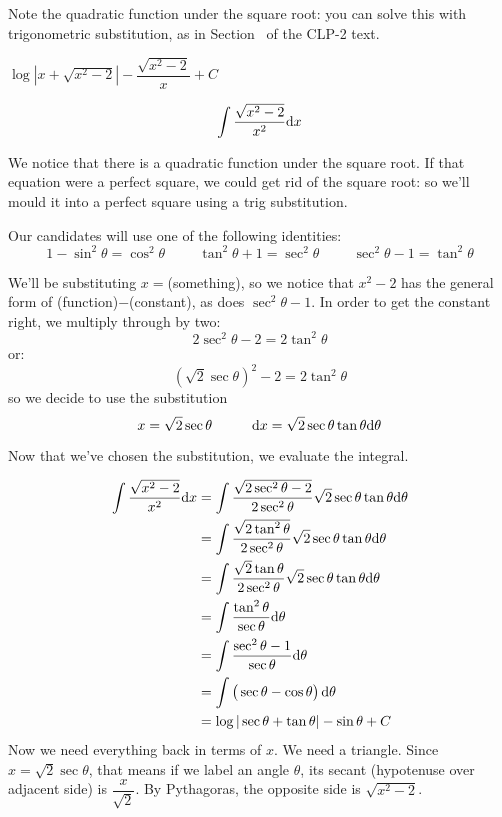 \begin{hint}
Note the quadratic function under the square root: you can solve this with trigonometric substitution, as in Section~ of the CLP-2 text.
\end{hint}

\begin{answer}
$\log \left| x+{\sqrt{x^2-2}}
\right|-\dfrac{\sqrt{x^2-2}}{x}+C$
\end{answer}

\begin{solution}

\[\int \frac{\sqrt{x^2-2}}{x^2}\mathrm{d}x\]

We notice that there is a quadratic function under the square root. If that equation were a perfect square, we could get rid of the square root: so we'll mould it into a perfect square using a trig substitution.

Our candidates will use one of the following identities:
\[1-\sin^2\theta=\cos^2\theta \hspace{1cm} \tan^2\theta+1=\sec^2\theta \hspace{1cm} \sec^2\theta-1=\tan^2\theta\]

We'll be substituting $x=$(something), so we notice that $x^2-2$ has the general form of
(function)$-$(constant), as does $\sec^2\theta-1$. In order to get the constant right, we multiply through by two:
\[2\sec^2\theta-2=2\tan^2\theta\]
or:
\[(\sqrt{2}\sec \theta)^2-2=2\tan^2\theta\]
so we decide to use the substitution
\[x=\sqrt{2}\sec\theta\hspace{1cm}\mathrm{d}x=\sqrt{2}\sec\theta\tan\theta \mathrm{d}\theta\]

Now that we've chosen the substitution, we evaluate the integral.

\begin{align*}
\int\frac{\sqrt{x^2-2}}{x^2}\mathrm{d}x&=\int\frac{\sqrt{2\sec^2\theta-2}}{2\sec^2\theta}\sqrt{2}\sec\theta\tan\theta \mathrm{d}\theta\\
&=\int
\frac{\sqrt{2\tan^2\theta}}{2\sec^2\theta}\sqrt{2}\sec\theta\tan\theta
\mathrm{d}\theta\\
&=\int
\frac{\sqrt{2}\tan\theta}{2\sec^2\theta}\sqrt{2}\sec\theta\tan\theta
\mathrm{d}\theta\\
&=\int
\frac{\tan^2\theta}{\sec\theta}
\mathrm{d}\theta\\
&=
\int \frac{\sec^2\theta-1}{\sec\theta}\mathrm{d}\theta\\
&=\int \big(\sec\theta-\cos\theta\big)\, \mathrm{d}\theta\\
&=\log|\sec\theta + \tan\theta|-\sin\theta +C
\end{align*}
Now we need everything back in terms of $x$. We need a triangle. Since $x=\sqrt{2}\sec\theta$, that means if we label an angle $\theta$, its secant (hypotenuse over adjacent side) is $\dfrac{x}{\sqrt{2}}$. By Pythagoras, the opposite side is $\sqrt{x^2-2}$.


\end{solution}
